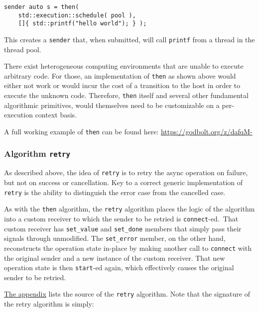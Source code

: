 \documentclass[a4paper,12pt,notitlepage,twoside,openright]{article}
\begin{document}
\begin{verbatim}
sender auto s = then(
    std::execution::schedule( pool ),
    []{ std::printf("hello world"); } );
\end{verbatim}

This creates a \texttt{sender} that, when submitted, will
call \texttt{printf} from a thread in the thread pool.

There exist heterogeneous computing environments that are unable to
execute arbitrary code. For those, an implementation of
\texttt{then} as shown above would either not work or would
incur the cost of a transition to the host in order to execute the
unknown code. Therefore, \texttt{then} itself and several
other fundamental algorithmic primitives, would themselves need to be
customizable on a per-execution context basis.

A full working example of \texttt{then} can be found here:
\url{https://godbolt.org/z/dafqM-}

\hypertarget{algorithm-retry}{%
\subsubsection{\texorpdfstring{Algorithm
\texttt{retry}}{Algorithm }}\label{algorithm-retry}}

As described above, the idea of \texttt{retry} is to retry
the async operation on failure, but not on success or cancellation. Key
to a correct generic implementation of \texttt{retry} is the
ability to distinguish the error case from the cancelled case.

As with the \texttt{then} algorithm, the
\texttt{retry} algorithm places the logic of the algorithm
into a custom receiver to which the sender to be retried is
\texttt{connect}-ed.~That custom receiver has
\texttt{set_value} and \texttt{set_done} members
that simply pass their signals through unmodified. The
\texttt{set_error} member, on the other hand, reconstructs
the operation state in-place by making another call to
\texttt{connect} with the original sender and a new instance
of the custom receiver. That new operation state is then
\texttt{start}-ed again, which effectively causes the
original sender to be retried.

\protect\hyperlink{appendix-the-retry-algorithm}{The appendix} lists the
source of the \texttt{retry} algorithm. Note that the
signature of the retry algorithm is simply:
\end{document}
